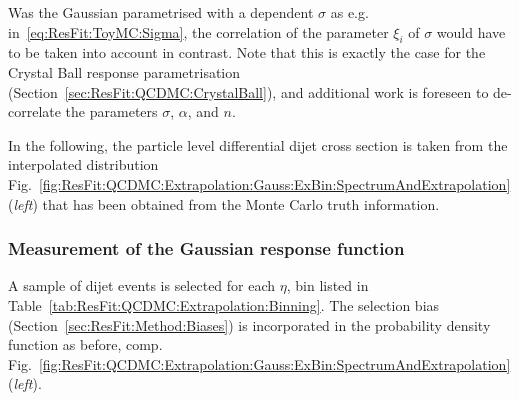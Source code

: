 Was the Gaussian parametrised with a \pt dependent $\sigma$ as e.g. in~\eqref{eq:ResFit:ToyMC:Sigma}, the correlation of the parameter $\xi_{i}$ of $\sigma$ would have to be taken into account in contrast.
Note that this is exactly the case for the Crystal Ball response parametrisation (Section~\ref{sec:ResFit:QCDMC:CrystalBall}), and additional work is foreseen to de-correlate the parameters $\sigma$, $\alpha$, and $n$.

In the following, the particle level differential dijet cross section is taken from the interpolated \ptgen distribution Fig.~\ref{fig:ResFit:QCDMC:Extrapolation:Gauss:ExBin:SpectrumAndExtrapolation} (\textit{left}) that has been obtained from the Monte Carlo truth information. 



\subsubsection{Measurement of the Gaussian response function}\label{sec:ResFit:QCDMC:Gauss}

A sample of dijet events is selected for each $\eta$, \pt bin listed in Table~\ref{tab:ResFit:QCDMC:Extrapolation:Binning}.
The selection bias (Section~\ref{sec:ResFit:Method:Biases}) is incorporated in the probability density function as before, comp. Fig.~\ref{fig:ResFit:QCDMC:Extrapolation:Gauss:ExBin:SpectrumAndExtrapolation} (\textit{left}).

